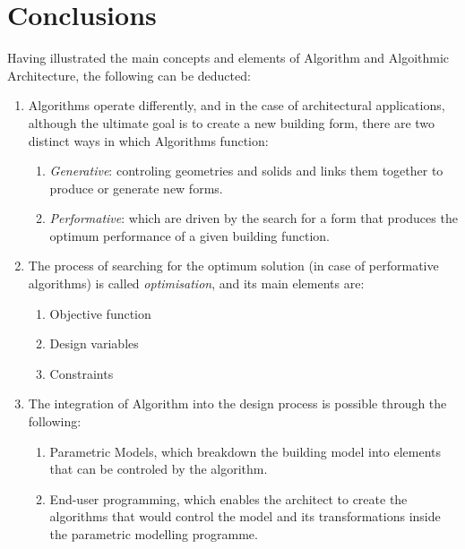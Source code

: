 \clearpage
\section{Conclusions}

Having illustrated the main concepts and elements of Algorithm and Algoithmic Architecture, the following can be deducted:
\vspace{-0.3cm}
\begin{enumerate}
	\item Algorithms operate differently, and in the case of architectural applications, although the ultimate goal is to create a new building form, there are two distinct ways in which Algorithms function:
		\begin{enumerate}
			\item \emph{Generative}: controling geometries and solids and links them together to produce or generate new forms.
			\item \emph{Performative}: which are driven by the search for a form that produces the optimum performance of a given building function.
		\end{enumerate}
	\item The process of searching for the optimum solution (in case of performative algorithms) is called \emph{optimisation}, and its main elements are:
		\begin{enumerate}
			\item Objective function
			\item Design variables
			\item Constraints
		\end{enumerate}
	\item The integration of Algorithm into the design process is possible through the following:
		\begin{enumerate}
			\item Parametric Models, which breakdown the building model into elements that can be controled by the algorithm.
			\item End-user programming, which enables the architect to create the algorithms that would control the model and its transformations inside the parametric modelling programme.
		\end{enumerate}
\end{enumerate}
